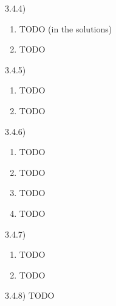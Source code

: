3.4.4)
\begin{enumerate}
  \item TODO (in the solutions)
  \item TODO
\end{enumerate}

3.4.5)
\begin{enumerate}
  \item TODO
  \item TODO
\end{enumerate}

3.4.6)
\begin{enumerate}
  \item TODO
  \item TODO
  \item TODO
  \item TODO
\end{enumerate}

3.4.7)
\begin{enumerate}
  \item TODO
  \item TODO
\end{enumerate}

3.4.8) TODO

